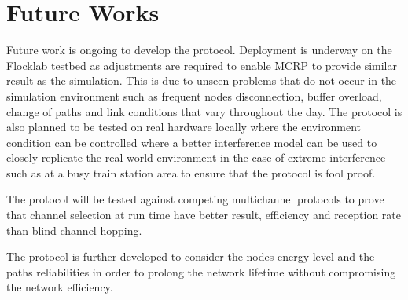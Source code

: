 \section{Future Works}
Future work is ongoing to develop the protocol. 
Deployment is underway on the Flocklab testbed as adjustments are required to enable MCRP to provide similar result as the simulation. This is due to unseen problems that do not occur in the simulation environment such as frequent nodes disconnection, buffer overload, change of paths and link conditions that vary throughout the day. The protocol is also planned to be tested on real hardware locally where the environment condition can be controlled where a better interference model can be used to closely replicate the real world environment in the case of extreme interference such as at a busy train station area to ensure that the protocol is fool proof.

The protocol will be tested against competing multichannel protocols to prove that channel selection at run time have better result, efficiency and reception rate than blind channel hopping.

The protocol is further developed to consider the nodes energy level and the paths reliabilities in order to prolong the network lifetime without compromising the network efficiency.


